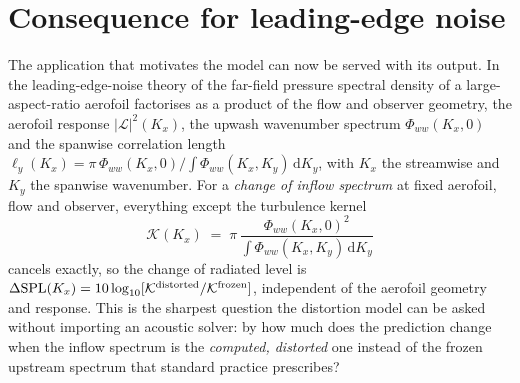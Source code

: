 \documentclass[lineno]{JFM-FLM_Au}
\begin{document}
\section{Consequence for leading-edge noise}\label{sec:lenoise}

The application that motivates the model can now be served with its
output. In the leading-edge-noise theory of \citet{Amiet1975} the
far-field pressure spectral density of a large-aspect-ratio aerofoil
factorises as a product of the flow and observer geometry, the aerofoil
response $|\mathcal L|^2(K_x)$, the upwash wavenumber spectrum
$\Phi_{ww}(K_x,0)$ and the spanwise correlation length
$\ell_y(K_x)=\pi\,\Phi_{ww}(K_x,0)/\!\int\Phi_{ww}(K_x,K_y)\,
\mathrm{d}K_y$, with $K_x$ the streamwise and $K_y$ the spanwise
wavenumber. For a \emph{change of inflow spectrum} at fixed aerofoil,
flow and observer, everything except the turbulence kernel
\begin{equation}
  \mathcal K(K_x)
  \;=\;
  \pi\,\frac{\Phi_{ww}(K_x,0)^2}{\int\Phi_{ww}(K_x,K_y)\,\mathrm{d}K_y}
  \label{eq:knoise}
\end{equation}
cancels exactly, so the change of radiated level is
$\Delta\mathrm{SPL}(K_x)=10\log_{10}
[\mathcal K^{\rm distorted}/\mathcal K^{\rm frozen}]$, independent of
the aerofoil geometry and response. This is the sharpest question the
distortion model can be asked without importing an acoustic solver:
by how much does the prediction change when the inflow spectrum is the
\emph{computed, distorted} one instead of the frozen upstream spectrum
that standard practice prescribes?
\end{document}
